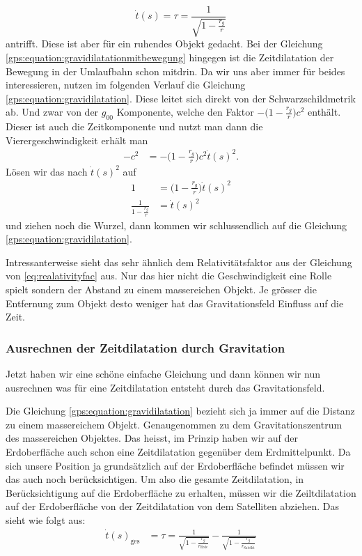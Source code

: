 \begin{refsection}
\begin{equation}
\label{gps:equation:gravidilatation}
\dot t(s) = \tau = \frac{1}{ \sqrt{\displaystyle 1 - \frac{r_g}{r} }}
\end{equation}
antrifft. Diese ist aber für ein ruhendes Objekt gedacht. Bei der Gleichung \eqref{gps:equation:gravidilatationmitbewegung} hingegen ist die Zeitdilatation der Bewegung in der Umlaufbahn  schon mitdrin. Da wir uns aber immer für beides interessieren, nutzen im folgenden Verlauf die Gleichung \eqref{gps:equation:gravidilatation}. Diese leitet sich direkt von der Schwarzschildmetrik ab. Und zwar von der $g_{00}$ Komponente, welche den Faktor $- \bigl( 1-\frac{r_g}{r} \bigr)c^2$ enthält. Dieser ist auch die Zeitkomponente und nutzt man dann die Vierergeschwindigkeit erhält man
\begin{align*}
-c^2 &= - \biggl( 1-\frac{r_g}{r} \biggr)c^2 \dot t(s)^2.
\end{align*}
Lösen wir das nach $\dot t(s)^2$ auf 
\begin{align*}
1 &= \biggl( 1-\frac{r_g}{r} \biggr) \dot t(s)^2
\\
\frac{1}{\displaystyle 1-\frac{r_g}{r}} &=  \dot t(s)^2
\end{align*}
und ziehen noch die Wurzel, dann kommen wir schlussendlich auf die Gleichung
\eqref{gps:equation:gravidilatation}.

Intressanterweise sieht das sehr ähnlich dem Relativitätsfaktor aus der Gleichung von \ref{eq:realativityfac} aus. Nur das hier nicht die Geschwindigkeit eine Rolle spielt sondern der Abstand zu einem massereichen Objekt. Je grösser die Entfernung zum Objekt desto weniger hat das Gravitationsfeld Einfluss auf die Zeit. 

\subsubsection{Ausrechnen der Zeitdilatation durch Gravitation}
Jetzt haben wir eine schöne einfache Gleichung und dann können wir nun ausrechnen was für eine Zeitdilatation entsteht durch das Gravitationsfeld.

Die Gleichung \ref{gps:equation:gravidilatation} bezieht sich ja immer auf die Distanz zu einem massereichem Objekt. Genaugenommen zu dem Gravitationszentrum des massereichen Objektes. Das heisst, im Prinzip haben wir auf der Erdoberfläche auch schon eine Zeitdilatation gegenüber dem Erdmittelpunkt. Da sich unsere Position ja grundsätzlich auf der Erdoberfläche befindet müssen wir das auch noch berücksichtigen. Um also die gesamte Zeitdilatation, in Berücksichtigung auf die Erdoberfläche zu erhalten, müssen wir die Zeiltdilatation auf der Erdoberfläche von der Zeitdilatation von dem Satelliten abziehen. Das sieht wie folgt aus:
\begin{align*}
\dot t(s)_ {\text{ges}} &= \tau = \frac{1}{\sqrt{\displaystyle 1-\frac{r_g}{r_{\text{Erde}}}}} - \frac{1}{\sqrt{\displaystyle 1-\frac{r_g}{r_{\text{Satellit}}}}}
\end{align*}


\end{refsection}
